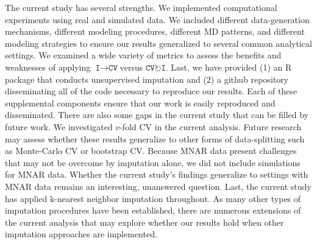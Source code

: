 \documentclass[AMA,STIX1COL,doublespace]{WileyNJD-v2}
\begin{document}
The current study has several strengths. We implemented computational
experiments using real and simulated data. We included different
data-generation mechanisms, different modeling procedures, different MD
patterns, and different modeling strategies to ensure our results
generalized to several common analytical settings. We examined a wide
variety of metrics to assess the benefits and weaknesses of applying
$\texttt{I}\!\!\rightarrow\!\texttt{CV}$\space versus
$\texttt{CV}\!\circlearrowright\!\texttt{I}$. Last, we have provided (1)
an R package that conducts unsupervised imputation and (2) a github
repository disseminating all of the code necessary to reproduce our
results. Each of these supplemental components ensure that our work is
easily reproduced and disseminated. There are also some gaps in the
current study that can be filled by future work. We investigated
\(v\)-fold CV in the current analysis. Future research may assess
whether these results generalize to other forms of data-splitting such
as Monte-Carlo CV or bootstrap CV. Because MNAR data present challenges
that may not be overcome by imputation alone, we did not include
simulations for MNAR data. Whether the current study's findings
generalize to settings with MNAR data remains an interesting, unanswered
question. Last, the current study has applied k-nearest neighbor
imputation throughout. As many other types of imputation procedures have
been established, there are numerous extensions of the current analysis
that may explore whether our results hold when other imputation
approaches are implemented.

\FloatBarrier
\end{document}
